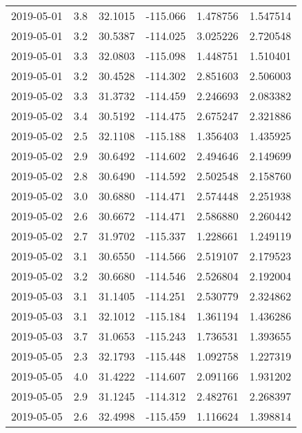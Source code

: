 \begin{tabular}{lrrrrr}
2019-05-01 &       3.8 &  32.1015 &  -115.066 &         1.478756 &         1.547514 \\
2019-05-01 &       3.2 &  30.5387 &  -114.025 &         3.025226 &         2.720548 \\
2019-05-01 &       3.3 &  32.0803 &  -115.098 &         1.448751 &         1.510401 \\
2019-05-01 &       3.2 &  30.4528 &  -114.302 &         2.851603 &         2.506003 \\
2019-05-02 &       3.3 &  31.3732 &  -114.459 &         2.246693 &         2.083382 \\
2019-05-02 &       3.4 &  30.5192 &  -114.475 &         2.675247 &         2.321886 \\
2019-05-02 &       2.5 &  32.1108 &  -115.188 &         1.356403 &         1.435925 \\
2019-05-02 &       2.9 &  30.6492 &  -114.602 &         2.494646 &         2.149699 \\
2019-05-02 &       2.8 &  30.6490 &  -114.592 &         2.502548 &         2.158760 \\
2019-05-02 &       3.0 &  30.6880 &  -114.471 &         2.574448 &         2.251938 \\
2019-05-02 &       2.6 &  30.6672 &  -114.471 &         2.586880 &         2.260442 \\
2019-05-02 &       2.7 &  31.9702 &  -115.337 &         1.228661 &         1.249119 \\
2019-05-02 &       3.1 &  30.6550 &  -114.566 &         2.519107 &         2.179523 \\
2019-05-02 &       3.2 &  30.6680 &  -114.546 &         2.526804 &         2.192004 \\
2019-05-03 &       3.1 &  31.1405 &  -114.251 &         2.530779 &         2.324862 \\
2019-05-03 &       3.1 &  32.1012 &  -115.184 &         1.361194 &         1.436286 \\
2019-05-03 &       3.7 &  31.0653 &  -115.243 &         1.736531 &         1.393655 \\
2019-05-05 &       2.3 &  32.1793 &  -115.448 &         1.092758 &         1.227319 \\
2019-05-05 &       4.0 &  31.4222 &  -114.607 &         2.091166 &         1.931202 \\
2019-05-05 &       2.9 &  31.1245 &  -114.312 &         2.482761 &         2.268397 \\
2019-05-05 &       2.6 &  32.4998 &  -115.459 &         1.116624 &         1.398814 \\

\end{tabular}
